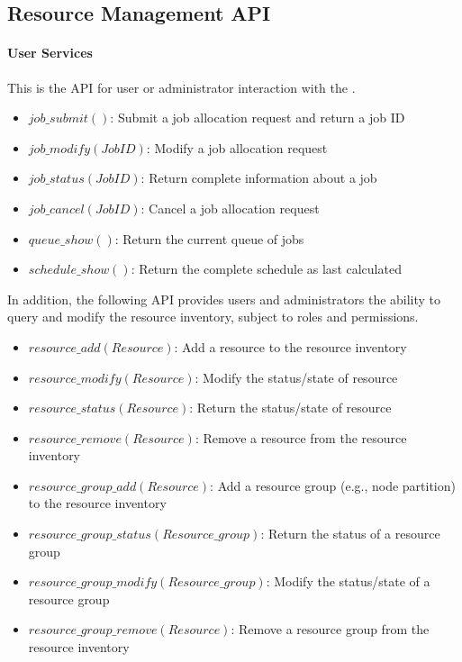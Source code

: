 \subsection{Resource Management API}

\paragraph{User Services}
This is the API for user or administrator interaction with the \ngrm.

\begin{itemize}
\item{$job\_submit()$: Submit a job allocation request and return a
  job ID}
\item{$job\_modify(JobID)$: Modify a job allocation request}
\item{$job\_status(JobID)$: Return complete information about a job}
\item{$job\_cancel(JobID)$: Cancel a job allocation request}
\item{$queue\_show()$: Return the current queue of jobs}
\item{$schedule\_show()$: Return the complete schedule as last
  calculated}
\end{itemize}

In addition, the following API provides users and administrators the
ability to query and modify the resource inventory, subject to roles
and permissions.

\begin{itemize}
\item{$resource\_add(Resource)$: Add a resource to the resource inventory}
\item{$resource\_modify(Resource)$: Modify the status/state of resource}
\item{$resource\_status(Resource)$: Return the status/state of resource}
\item{$resource\_remove(Resource)$: Remove a resource from the resource inventory}
\item{$resource\_group\_add(Resource)$: Add a resource group (e.g., node partition) to the resource inventory}
\item{$resource\_group\_status(Resource\_group)$: Return the status of a resource group}
\item{$resource\_group\_modify(Resource\_group)$: Modify the status/state of a resource group}
\item{$resource\_group\_remove(Resource)$: Remove a resource group from the resource inventory}
\end{itemize}


